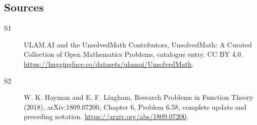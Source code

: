 \documentclass[11pt]{article}
\begin{document}
\subsection{Sources}
\begin{description}
\item[\hypertarget{source:statement:1}{S1}] ULAM.AI and the UnsolvedMath Contributors, UnsolvedMath: A Curated Collection of Open Mathematics Problems, catalogue entry. CC BY 4.0. \url{https://huggingface.co/datasets/ulamai/UnsolvedMath}.
\item[\hypertarget{source:statement:2}{S2}] W. K. Hayman and E. F. Lingham, Research Problems in Function Theory (2018), arXiv:1809.07200, Chapter 6, Problem 6.58, complete update and preceding notation. \url{https://arxiv.org/abs/1809.07200}.
\end{description}
\label{end:statement}
\end{document}
